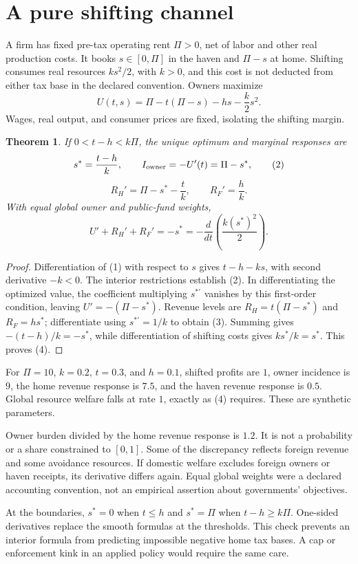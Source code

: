 \documentclass[11pt,a4paper]{article}
\newtheorem{theorem}{Theorem}[section]
\begin{document}
\section{A pure shifting channel}
A firm has fixed pre-tax operating rent $\Pi>0$, net of labor and other real production costs. It books $s\in[0,\Pi]$ in the haven and $\Pi-s$ at home. Shifting consumes real resources $ks^2/2$, with $k>0$, and this cost is not deducted from either tax base in the declared convention. Owners maximize
\[
 U(t,s)=\Pi-t(\Pi-s)-hs-\frac{k}{2}s^2.
 \tag{1}
\]
Wages, real output, and consumer prices are fixed, isolating the shifting margin.
\begin{theorem}
If $0<t-h<k\Pi$, the unique optimum and marginal responses are
\[
 s^*=\frac{t-h}{k},\qquad
 I_{\rm owner}=-U'(t)=\Pi-s^*,
 \tag{2}
\]
\[
 R_H'=\Pi-s^*-\frac{t}{k},\qquad R_F'=\frac{h}{k}.
 \tag{3}
\]
With equal global owner and public-fund weights,
\[
 U'+R_H'+R_F'=-s^*=-\frac{d}{dt}\left(\frac{k(s^*)^2}{2}\right).
 \tag{4}
\]
\end{theorem}
\begin{proof}
Differentiation of (1) with respect to $s$ gives $t-h-ks$, with second derivative $-k<0$. The interior restrictions establish (2). In differentiating the optimized value, the coefficient multiplying $s^{*\prime}$ vanishes by this first-order condition, leaving $U'=-(\Pi-s^*)$. Revenue levels are $R_H=t(\Pi-s^*)$ and $R_F=hs^*$; differentiate using $s^{*\prime}=1/k$ to obtain (3). Summing gives $-(t-h)/k=-s^*$, while differentiation of shifting costs gives $ks^*/k=s^*$. This proves (4).
\end{proof}
For $\Pi=10$, $k=0.2$, $t=0.3$, and $h=0.1$, shifted profits are $1$, owner incidence is $9$, the home revenue response is $7.5$, and the haven revenue response is $0.5$. Global resource welfare falls at rate $1$, exactly as (4) requires. These are synthetic parameters.

Owner burden divided by the home revenue response is $1.2$. It is not a probability or a share constrained to $[0,1]$. Some of the discrepancy reflects foreign revenue and some avoidance resources. If domestic welfare excludes foreign owners or haven receipts, its derivative differs again. Equal global weights were a declared accounting convention, not an empirical assertion about governments' objectives.

At the boundaries, $s^*=0$ when $t\le h$ and $s^*=\Pi$ when $t-h\ge k\Pi$. One-sided derivatives replace the smooth formulas at the thresholds. This check prevents an interior formula from predicting impossible negative home tax bases. A cap or enforcement kink in an applied policy would require the same care.
\end{document}
